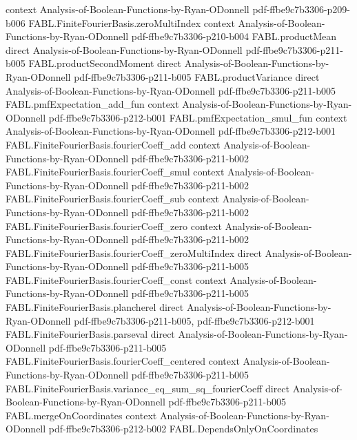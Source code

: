 \begin{theorem}
  {context}
  {Analysis-of-Boolean-Functions-by-Ryan-ODonnell}
  {pdf-ffbe9c7b3306-p209-b006}
\proofstep
  {FABL.FiniteFourierBasis.zeroMultiIndex}
  {context}
  {Analysis-of-Boolean-Functions-by-Ryan-ODonnell}
  {pdf-ffbe9c7b3306-p210-b004}
\proofstep
  {FABL.productMean}
  {direct}
  {Analysis-of-Boolean-Functions-by-Ryan-ODonnell}
  {pdf-ffbe9c7b3306-p211-b005}
\proofstep
  {FABL.productSecondMoment}
  {direct}
  {Analysis-of-Boolean-Functions-by-Ryan-ODonnell}
  {pdf-ffbe9c7b3306-p211-b005}
\proofstep
  {FABL.productVariance}
  {direct}
  {Analysis-of-Boolean-Functions-by-Ryan-ODonnell}
  {pdf-ffbe9c7b3306-p211-b005}
\proofstep
  {FABL.pmfExpectation_add_fun}
  {context}
  {Analysis-of-Boolean-Functions-by-Ryan-ODonnell}
  {pdf-ffbe9c7b3306-p212-b001}
\proofstep
  {FABL.pmfExpectation_smul_fun}
  {context}
  {Analysis-of-Boolean-Functions-by-Ryan-ODonnell}
  {pdf-ffbe9c7b3306-p212-b001}
\proofstep
  {FABL.FiniteFourierBasis.fourierCoeff_add}
  {context}
  {Analysis-of-Boolean-Functions-by-Ryan-ODonnell}
  {pdf-ffbe9c7b3306-p211-b002}
\proofstep
  {FABL.FiniteFourierBasis.fourierCoeff_smul}
  {context}
  {Analysis-of-Boolean-Functions-by-Ryan-ODonnell}
  {pdf-ffbe9c7b3306-p211-b002}
\proofstep
  {FABL.FiniteFourierBasis.fourierCoeff_sub}
  {context}
  {Analysis-of-Boolean-Functions-by-Ryan-ODonnell}
  {pdf-ffbe9c7b3306-p211-b002}
\proofstep
  {FABL.FiniteFourierBasis.fourierCoeff_zero}
  {context}
  {Analysis-of-Boolean-Functions-by-Ryan-ODonnell}
  {pdf-ffbe9c7b3306-p211-b002}
\proofstep
  {FABL.FiniteFourierBasis.fourierCoeff_zeroMultiIndex}
  {direct}
  {Analysis-of-Boolean-Functions-by-Ryan-ODonnell}
  {pdf-ffbe9c7b3306-p211-b005}
\proofstep
  {FABL.FiniteFourierBasis.fourierCoeff_const}
  {context}
  {Analysis-of-Boolean-Functions-by-Ryan-ODonnell}
  {pdf-ffbe9c7b3306-p211-b005}
\proofstep
  {FABL.FiniteFourierBasis.plancherel}
  {direct}
  {Analysis-of-Boolean-Functions-by-Ryan-ODonnell}
  {pdf-ffbe9c7b3306-p211-b005,
    pdf-ffbe9c7b3306-p212-b001}
\proofstep
  {FABL.FiniteFourierBasis.parseval}
  {direct}
  {Analysis-of-Boolean-Functions-by-Ryan-ODonnell}
  {pdf-ffbe9c7b3306-p211-b005}
\proofstep
  {FABL.FiniteFourierBasis.fourierCoeff_centered}
  {context}
  {Analysis-of-Boolean-Functions-by-Ryan-ODonnell}
  {pdf-ffbe9c7b3306-p211-b005}
\proofstep
  {FABL.FiniteFourierBasis.variance_eq_sum_sq_fourierCoeff}
  {direct}
  {Analysis-of-Boolean-Functions-by-Ryan-ODonnell}
  {pdf-ffbe9c7b3306-p211-b005}
\proofstep
  {FABL.mergeOnCoordinates}
  {context}
  {Analysis-of-Boolean-Functions-by-Ryan-ODonnell}
  {pdf-ffbe9c7b3306-p212-b002}
\proofstep
  {FABL.DependsOnlyOnCoordinates}

\end{theorem}
